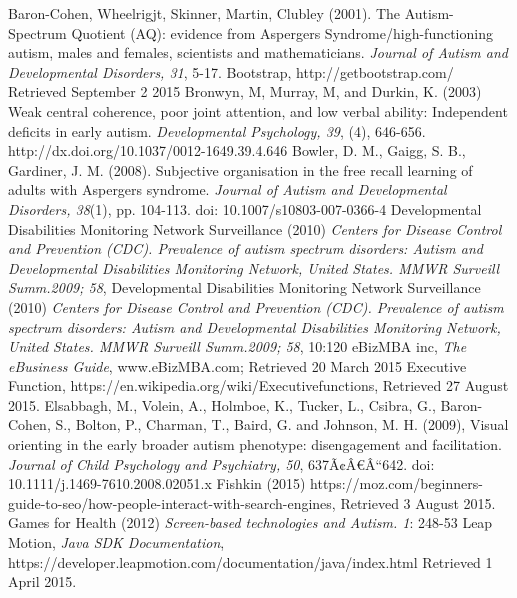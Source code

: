 \documentclass[a4paper, 11pt]{article}
\begin{document}
\clearpage
\begin{thebibliography}{100}

 Baron-Cohen, Wheelrigjt, Skinner, Martin, Clubley (2001).  The Autism-Spectrum Quotient (AQ): evidence from Aspergers Syndrome/high-functioning autism, males and females, scientists and mathematicians.  \textit{Journal of Autism and Developmental Disorders, 31}, 5-17.
Bootstrap, http://getbootstrap.com/ Retrieved September 2 2015
 Bronwyn, M, Murray, M, and Durkin, K. (2003) Weak central coherence, poor joint attention, and low verbal ability: Independent deficits in early autism. \textit{Developmental Psychology, 39}, (4), 646-656. http://dx.doi.org/10.1037/0012-1649.39.4.646
 Bowler, D. M., Gaigg, S. B., Gardiner, J. M. (2008). Subjective organisation in the free recall learning of adults with Aspergers syndrome. \textit{Journal of Autism and Developmental Disorders, 38}(1), pp. 104-113. doi: 10.1007/s10803-007-0366-4 
Developmental Disabilities Monitoring Network Surveillance (2010) \textit{Centers for Disease Control and Prevention (CDC). Prevalence of autism spectrum disorders: Autism and Developmental Disabilities Monitoring Network, United States. MMWR Surveill Summ.2009; 58},
Developmental Disabilities Monitoring Network Surveillance (2010) \textit{Centers for Disease Control and Prevention (CDC). Prevalence of autism spectrum disorders: Autism and Developmental Disabilities Monitoring Network, United States. MMWR Surveill Summ.2009; 58}, 10:120
eBizMBA inc, \textit{The eBusiness Guide}, www.eBizMBA.com; Retrieved 20 March 2015
 Executive Function, https://en.wikipedia.org/wiki/Executivefunctions, Retrieved 27 August 2015.
Elsabbagh, M., Volein, A., Holmboe, K., Tucker, L., Csibra, G., Baron-Cohen, S., Bolton, P., Charman, T., Baird, G. and Johnson, M. H. (2009), Visual orienting in the early broader autism phenotype: disengagement and facilitation. \textit{Journal of Child Psychology and Psychiatry, 50}, 637Ã¢Â€Â“642. doi: 10.1111/j.1469-7610.2008.02051.x
 Fishkin (2015) https://moz.com/beginners-guide-to-seo/how-people-interact-with-search-engines, Retrieved 3 August 2015.
 Games for Health (2012) \textit{Screen-based technologies and Autism. 1}: 248-53
 Leap Motion, \textit{Java SDK Documentation}, \\https://developer.leapmotion.com/documentation/java/index.html Retrieved 1 April 2015.

\end{thebibliography}
\end{document}
